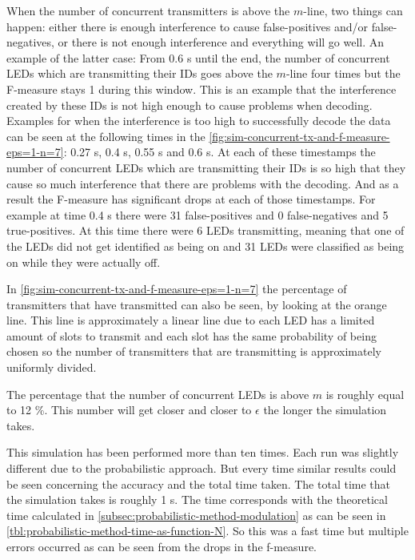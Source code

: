 When the number of concurrent transmitters is above the $m$-line, two things can happen: either there is enough interference to cause false-positives and/or false-negatives, or there is not enough interference and everything will go well.
An example of the latter case: From 0.6 s until the end, the number of concurrent LEDs which are transmitting their IDs goes above the $m$-line four times but the F-measure stays 1 during this window.
This is an example that the interference created by these IDs is not high enough to cause problems when decoding.
Examples for when the interference is too high to successfully decode the data can be seen at the following times in the \autoref{fig:sim-concurrent-tx-and-f-measure-eps=1-n=7}: 0.27 s, 0.4 s, 0.55 s and 0.6 s.
At each of these timestamps the number of concurrent LEDs which are transmitting their IDs is so high that they cause so much interference that there are problems with the decoding.
And as a result the F-measure has significant drops at each of those timestamps.
For example at time 0.4 s there were 31 false-positives and 0 false-negatives and 5 true-positives.
At this time there were 6 LEDs transmitting, meaning that one of the LEDs did not get identified as being on and 31 LEDs were classified as being on while they were actually off.



In \autoref{fig:sim-concurrent-tx-and-f-measure-eps=1-n=7} the percentage of transmitters that have transmitted can also be seen, by looking at the orange line.
This line is approximately a linear line due to each LED has a limited amount of slots to transmit and each slot has the same probability of being chosen so the number of transmitters that are transmitting is approximately uniformly divided.


The percentage that the number of concurrent LEDs is above $m$ is roughly equal to 12 \%.
This number will get closer and closer to $\epsilon$ the longer the simulation takes.


This simulation has been performed more than ten times.
Each run was slightly different due to the probabilistic approach.
But every time similar results could be seen concerning the accuracy and the total time taken.
The total time that the simulation takes is roughly 1 s.
The time corresponds with the theoretical time calculated in \autoref{subsec:probabilistic-method-modulation} as can be seen in \autoref{tbl:probabilistic-method-time-as-function-N}.
So this was a fast time but multiple errors occurred as can be seen from the drops in the f-measure.




